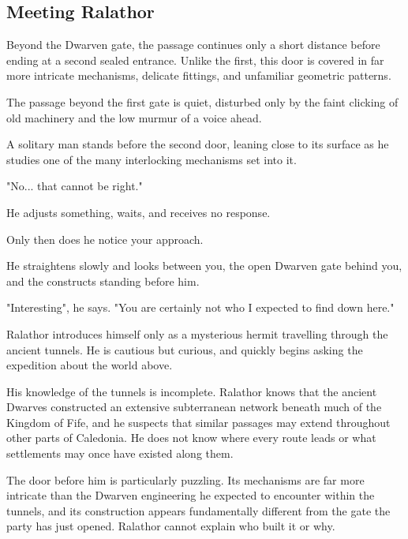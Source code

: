 \subsection*{ Meeting Ralathor}
{\entryfont Beyond the Dwarven gate, the passage continues only a short distance before ending at a second sealed entrance. Unlike the first, this door is covered in far more intricate mechanisms, delicate fittings, and unfamiliar geometric patterns.}
\begin{DndReadAloud}
	The passage beyond the first gate is quiet, disturbed only by the faint clicking of old machinery and the low murmur of a voice ahead.

	A solitary man stands before the second door, leaning close to its surface as he studies one of the many interlocking mechanisms set into it.

	"No... that cannot be right."

	He adjusts something, waits, and receives no response.

	Only then does he notice your approach.

	He straightens slowly and looks between you, the open Dwarven gate behind you, and the constructs standing before him.

	"Interesting", he says. "You are certainly not who I expected to find down here."
\end{DndReadAloud}
{\noindent\entryfont Ralathor introduces himself only as a mysterious hermit travelling through the ancient tunnels. He is cautious but curious, and quickly begins asking the expedition about the world above.

His knowledge of the tunnels is incomplete. Ralathor knows that the ancient Dwarves constructed an extensive subterranean network beneath much of the Kingdom of Fife, and he suspects that similar passages may extend throughout other parts of Caledonia. He does not know where every route leads or what settlements may once have existed along them.

The door before him is particularly puzzling. Its mechanisms are far more intricate than the Dwarven engineering he expected to encounter within the tunnels, and its construction appears fundamentally different from the gate the party has just opened. Ralathor cannot explain who built it or why.}
